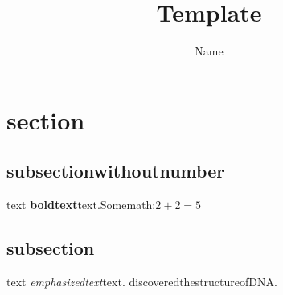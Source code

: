 \documentclass[11pt]{article}
\title{Template}
\author{Name}
\begin{document}
\maketitle


\section{section}
\subsection*{subsectionwithoutnumber}text
\textbf{boldtext}text.Somemath:$2+2=5$
\subsection{subsection}text
\emph{emphasizedtext}text.
\cite{WC:1953}discoveredthestructureofDNA.
\end{document}
